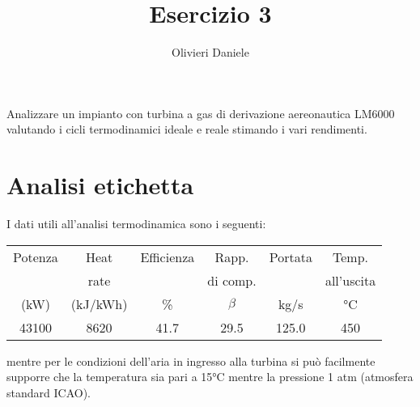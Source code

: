 \documentclass[a4paper,12pt]{article}
\title{Esercizio 3}
\author{Olivieri Daniele}
\date{}
\begin{document}
\maketitle

Analizzare un impianto con turbina a gas di derivazione aereonautica LM6000 valutando i cicli termodinamici ideale e reale stimando i vari rendimenti.
\section{Analisi etichetta}
\label{sec:analisi_etichetta}
I dati utili all'analisi termodinamica sono i seguenti:
\begin{center}
    \begin{tabular}{cccccc}
         Potenza   & Heat  & Efficienza   & Rapp.  & Portata    &  Temp. \\
                   &rate  &              & di comp. &    &        all'uscita \\
            (kW)   &  (kJ/kWh) & \%    &    $\beta$  &   kg/s      &  °C \\ \hline
        43100    &  8620    &  41.7   &  29.5  &     125.0        &  450
    \end{tabular}
\end{center}
mentre per le condizioni dell'aria in ingresso alla turbina si può facilmente supporre che la temperatura sia pari a 15°C mentre la pressione 1 atm
(atmosfera standard ICAO).
\end{document}

